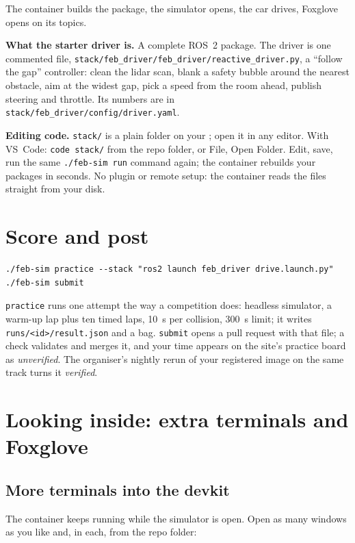 The container builds the package, the simulator opens, the car drives, Foxglove opens on its
topics.

\textbf{What the starter driver is.} A complete ROS~2 package. The driver is one commented file,
\texttt{stack/feb\_driver/feb\_driver/reactive\_driver.py}, a ``follow the gap'' controller: clean
the lidar scan, blank a safety bubble around the nearest obstacle, aim at the widest gap, pick a
speed from the room ahead, publish steering and throttle. Its numbers are in
\texttt{stack/feb\_driver/config/driver.yaml}.

\textbf{Editing code.} \texttt{stack/} is a plain folder on your \OSname; open it in any editor. With
VS~Code: \texttt{code stack/} from the repo folder, or File, Open Folder. Edit, save, run the same
\texttt{./feb-sim run} command again; the container rebuilds your packages in seconds. No plugin
or remote setup: the container reads the files straight from your disk.

\section{Score and post}

\begin{lstlisting}
./feb-sim practice --stack "ros2 launch feb_driver drive.launch.py"
./feb-sim submit
\end{lstlisting}

\texttt{practice} runs one attempt the way a competition does: headless simulator, a warm-up lap
plus ten timed laps, 10~s per collision, 300~s limit; it writes \texttt{runs/<id>/result.json} and a
bag. \texttt{submit} opens a pull request with that file; a check validates and merges it, and your
time appears on the site's practice board as \emph{unverified}. The organiser's nightly rerun of your
registered image on the same track turns it \emph{verified}.

\section{Looking inside: extra terminals and Foxglove}

\subsection*{More terminals into the devkit}

The container keeps running while the simulator is open. Open as many \OSterm{} windows as you
like and, in each, from the repo folder:

